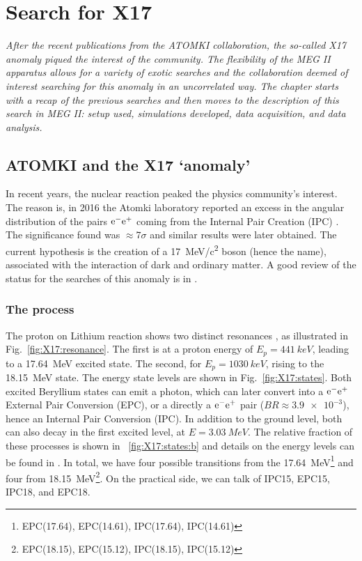 \chapter{Search for X17}
\begin{refsection}
\label{ch:X17}
{\itshape After the recent publications from the ATOMKI collaboration, the so-called X17 anomaly piqued the interest of the community. The flexibility of the MEG II apparatus allows for a variety of exotic searches and the collaboration deemed of interest searching for this anomaly in an uncorrelated way.
The chapter starts with a recap of the previous searches and then moves to the description of this search in MEG II: setup used, simulations developed, data acquisition, and data analysis.}

\section{ATOMKI and the X17 `anomaly'}
    In recent years, the nuclear reaction  peaked the physics community's interest.
    The reason is, in 2016 the Atomki laboratory reported an excess in the angular distribution of the pairs $\text{e}^- \text{e}^+$ coming from the Internal Pair Creation (IPC) \cite{X17:results:2017}.
    The significance found was $\approx7\sigma$ and similar results were later obtained.
    The current hypothesis is the creation of a \SI{17}{MeV/c^2} boson (hence the name), associated with the interaction of dark and ordinary matter.
    A good review of the status for the searches of this anomaly is in \cite{X17:2023}.
    
    \subsection{The process}
        The proton on Lithium reaction shows two distinct resonances \cite{X17:crossections}, as illustrated in Fig.~\ref{fig:X17:resonance}.
        The first is at a proton energy of $E_p=\SI{441}{keV}$, leading to a \SI{17.64}{MeV} excited state.
        The second, for $E_p=\SI{1030}{keV}$, rising to the \SI{18.15}{MeV} state.
        The energy state levels are shown in Fig.~\ref{fig:X17:states}.
        Both excited Beryllium states can emit a photon, which can later convert into a $\text{e}^-\text{e}^+$ External Pair Conversion (EPC), or a directly a $\text{e}^-\text{e}^+$ pair ($BR\approx\num{3.9e-3}$), hence an Internal Pair Conversion (IPC).
        In addition to the ground level, both can also decay in the first excited level, at $E=\SI{3.03}{MeV}$.
        The relative fraction of these processes is shown in ~\ref{fig:X17:states:b} and details on the energy levels can be found in \cite{X17:Elevels:2004}.
        In total, we have four possible transitions from the \SI{17.64}{MeV}\footnote{EPC(17.64), EPC(14.61), IPC(17.64), IPC(14.61)} and four from \SI{18.15}{MeV}\footnote{EPC(18.15), EPC(15.12), IPC(18.15), IPC(15.12)}. 
        On the practical side, we can talk of IPC15, EPC15, IPC18, and EPC18.
        

\end{refsection}
